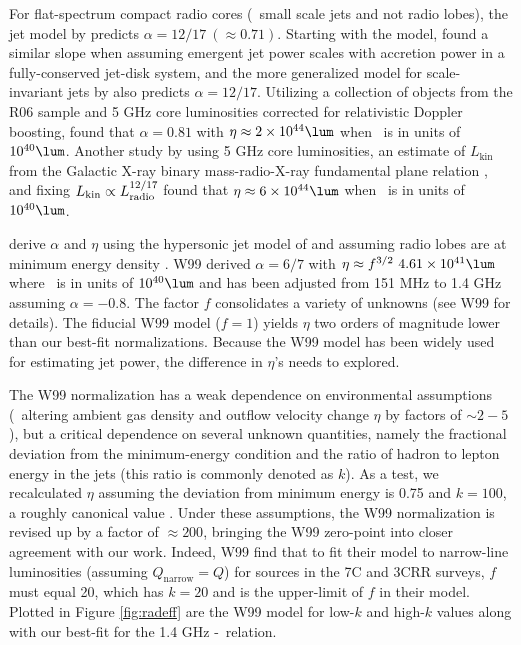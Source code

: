 \documentclass{emulateapj}
\begin{document}
For flat-spectrum compact radio cores (\eg\ small scale jets and not
radio lobes), the jet model by \citet{1979ApJ...232...34B} predicts
$\alpha = 12/17~(\approx 0.71)$. Starting with the
\citet{1979ApJ...232...34B} model, \citet{1995A&A...293..665F} found a
similar slope when assuming emergent jet power scales with accretion
power in a fully-conserved jet-disk system, and the more generalized
model for scale-invariant jets by \citet{2003MNRAS.343L..59H} also
predicts $\alpha = 12/17$. Utilizing a collection of objects from the
R06 sample and 5 GHz core luminosities corrected for relativistic
Doppler boosting, \citet{2007MNRAS.381..589M} found that $\alpha =
0.81$ with $\eta \approx 2\times10^{44} \lum$ when \prad\ is in units
of $10^{40} \lum$. Another study by \citet{2005ApJ...633..384H} using
5 GHz core luminosities, an estimate of $L_{\mathrm{kin}}$ from the
Galactic X-ray binary mass-radio-X-ray fundamental plane relation
\citep{2003MNRAS.344...60G, 2003MNRAS.345.1057M}, and fixing
$L_{\mathrm{kin}} \propto L_{\mathrm{radio}}^{12/17}$ found that $\eta \approx
6\times10^{44} \lum$ when \prad\ is in units of $10^{40} \lum$.

\citet[][hereafter W99]{1999MNRAS.309.1017W} derive $\alpha$ and
$\eta$ using the hypersonic jet model of \citet{1991MNRAS.250..581F}
and assuming radio lobes are at minimum energy density \citep[see][for
  details]{1980ARA&A..18..165M}. W99 derived $\alpha = 6/7$ with $\eta
\approx f^{3/2}~4.61\times10^{41} \lum$ where \prad\ is in units of
$10^{40} \lum$ and has been adjusted from 151 MHz to 1.4 GHz assuming
$\alpha = -0.8$. The factor $f$ consolidates a variety of unknowns
(see W99 for details). The fiducial W99 model ($f=1$) yields $\eta$
two orders of magnitude lower than our best-fit
normalizations. Because the W99 model has been widely used for
estimating jet power, the difference in $\eta$'s needs to explored.

The W99 normalization has a weak dependence on environmental
assumptions (\ie\ altering ambient gas density and outflow velocity
change $\eta$ by factors of $\sim 2-5$), but a critical dependence on
several unknown quantities, namely the fractional deviation from the
minimum-energy condition and the ratio of hadron to lepton energy in
the jets (this ratio is commonly denoted as $k$). As a test, we
recalculated $\eta$ assuming the deviation from minimum energy is 0.75
and $k = 100$, a roughly canonical value \citep{2005MNRAS.364.1343D,
  2006MNRAS.372.1741D, 2006ApJ...648..200D, birzan08}. Under these
assumptions, the W99 normalization is revised up by a factor of
$\approx 200$, bringing the W99 zero-point into closer agreement with
our work. Indeed, W99 find that to fit their model to narrow-line
luminosities (assuming $Q_{\mathrm{narrow}} = Q$) for sources in the
7C and 3CRR surveys, $f$ must equal 20, which has $k = 20$ and is the
upper-limit of $f$ in their model. Plotted in Figure \ref{fig:radeff}
are the W99 model for low-$k$ and high-$k$ values along with our
best-fit for the 1.4 GHz \pjet-\prad\ relation.
\end{document}

